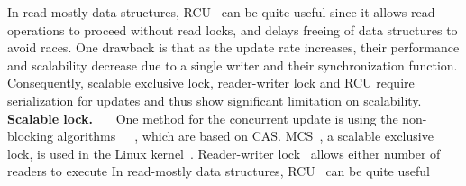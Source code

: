 In read-mostly data structures, RCU~\cite{McKenney98} can be quite useful
since it allows read operations to proceed without read locks, and delays
freeing of data structures to avoid races. One drawback is that as the update
rate increases, their performance and scalability decrease due to a single
writer and their synchronization function.
Consequently, 
scalable exclusive lock, reader-writer lock
and RCU require serialization for updates and thus show significant limitation
 on scalability. 
\else
\noindent
\textbf{Scalable lock.}
~\cite{Wang2016BeMyGuest}~\cite{Bueso2015STP}~\cite{Bueso2014MCS}One method for
the concurrent update is using the non-blocking algorithms~\cite{Harris2001Lockfree}~\cite{Fomitchev2004Lockfree}~\cite{Timnat2012},
 which are based on CAS.
MCS~\cite{MellorCrummey91}, a scalable exclusive lock, is used in the Linux
kernel~\cite{MCSLocksKernel}.
Reader-writer lock~\cite{Courtois71} allows either number of readers to execute
In read-mostly data structures, RCU~\cite{McKenney98} can be quite useful
\fi








 
